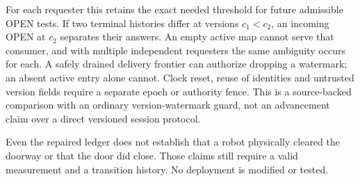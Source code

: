 \documentclass[11pt]{article}
\begin{document}
For each requester this retains the exact needed threshold for
future admissible OPEN tests. If two terminal histories differ
at versions \(c_1<c_2\), an incoming OPEN at \(c_2\) separates their
answers. An empty active map cannot serve that consumer, and with
multiple independent requesters the same ambiguity occurs for
each. A safely drained delivery frontier can authorize dropping
a watermark; an absent active entry alone cannot. Clock reset,
reuse of identities and untrusted version fields require a separate
epoch or authority fence. This is a source-backed comparison
with an ordinary version-watermark guard, not an advancement
claim over a direct versioned session protocol.

Even the repaired ledger does not establish that a robot
physically cleared the doorway or that the door did close.
Those claims still require a valid measurement and a transition
history. No deployment is modified or tested.
\end{document}
